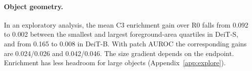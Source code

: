 \paragraph{Object geometry.} In an exploratory analysis, the mean C3 enrichment gain over R0 falls from 0.092 to 0.002 between the smallest and largest foreground-area quartiles in DeiT-S, and from 0.165 to 0.008 in DeiT-B. With patch AUROC the corresponding gains are 0.024/0.026 and 0.042/0.046. The size gradient depends on the endpoint. Enrichment has less headroom for large objects (Appendix~\ref{app:explore}).
